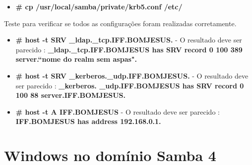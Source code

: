 \begin{itemize}
	\item \textbf{\# cp /usr/local/samba/private/krb5.conf  /etc/}
\end{itemize}

Teste para verificar se todos as configurações foram realizadas corretamente.

\begin{itemize}
	\item \textbf{\# host -t SRV \_ldap.\_tcp.IFF.BOMJESUS.} - O resultado deve ser parecido : \textbf{\_ldap.\_tcp.IFF.BOMJESUS has SRV record 0 100 389 server.``nome do realm sem aspas".}
	\item \textbf{\# host -t SRV \_kerberos.\_udp.IFF.BOMJESUS.} - O resultado deve ser parecido : \textbf{\_kerberos. \_udp.IFF.BOMJESUS has SRV record 0 100 88 server.IFF.BOMJESUS.}
	\item \textbf{\# host -t A IFF.BOMJESUS} - O resultado deve ser parecido : \textbf{IFF.BOMJESUS has address 192.168.0.1.} 
\end{itemize}

\section{Windows no domínio Samba 4}


